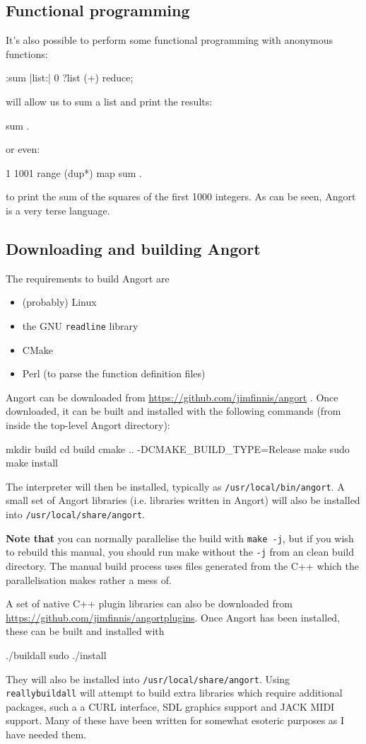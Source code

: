 \subsection{Functional programming}
It's also possible to perform some functional programming with
anonymous functions:
\begin{v}
:sum |list:| 0 ?list (+) reduce;
\end{v}
will allow us to sum a list and print the results:
\begin{v}
[1,2,3,4,5] sum .
\end{v}
or even:
\begin{v}
1 1001 range (dup*) map sum .
\end{v}
to print the sum of the squares of the first 1000 integers.
As can be seen, Angort is a very terse language.

\subsection{Downloading and building Angort}
The requirements to build Angort are
\begin{itemize}
\item (probably) Linux
\item the GNU \texttt{readline} library
\item CMake
\item Perl (to parse the function definition files)
\end{itemize}
Angort can be downloaded from \url{https://github.com/jimfinnis/angort} .
Once downloaded, it can be built and installed 
with the following commands (from
inside the top-level Angort directory):
\begin{v}
mkdir build
cd build
cmake .. -DCMAKE_BUILD_TYPE=Release
make
sudo make install
\end{v}
The
interpreter will then be installed, typically as \texttt{/usr/local/bin/angort}. 
A small set of Angort libraries (i.e. libraries written in Angort) will also be installed
into \texttt{/usr/local/share/angort}.

\textbf{Note that} you can normally parallelise the build with
\texttt{make -j}, but if you wish to rebuild this manual,
you should run make without the \texttt{-j} from an clean build
directory. The manual build process uses files generated from the
C++ which the parallelisation makes rather a mess of.

A set
of native C++ plugin libraries can also be downloaded from
\url{https://github.com/jimfinnis/angortplugins}. Once Angort has
been installed, these can be built and installed with
\begin{v}
./buildall
sudo ./install
\end{v}
They will also be installed into \texttt{/usr/local/share/angort}.
Using \texttt{reallybuildall} will attempt to build extra libraries
which require additional packages, such a a CURL interface, SDL
graphics support and JACK MIDI support. Many of these have been written for
somewhat esoteric purposes as I have needed them.



